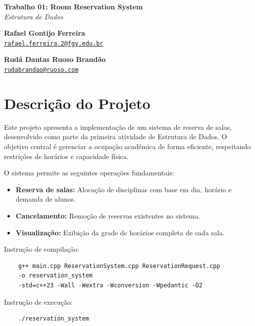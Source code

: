 \documentclass[11pt,a4paper]{article}
\begin{document}
\onehalfspacing
\begin{center}
    \vspace*{0.5cm}
    {\LARGE \textbf{Trabalho 01: Room Reservation System}} \\
    \textit{Estrutura de Dados} \\
    \vspace{0.8cm}

    \begin{minipage}{0.45\textwidth}
        \centering
        \textbf{Rafael Gontijo Ferreira} \\
        \href{mailto:rafael.ferreira.2@fgv.edu.br}{\footnotesize \texttt{rafael.ferreira.2@fgv.edu.br}}
    \end{minipage}
    \begin{minipage}{0.45\textwidth}
        \centering
        \textbf{Rudá Dantas Ruoso Brandão} \\
        \href{mailto:rudabrandao@ruoso.com}{\footnotesize \texttt{rudabrandao@ruoso.com}}
    \end{minipage}
    
    \vspace{0.8cm}
\end{center}

\section*{Descrição do Projeto}
Este projeto apresenta a implementação de um sistema de reserva de salas, desenvolvido como parte da primeira atividade de Estrutura de Dados. O objetivo central é gerenciar a ocupação acadêmica de forma eficiente, respeitando restrições de horários e capacidade física.

O sistema permite as seguintes operações fundamentais:
\begin{itemize}
    \item \textbf{Reserva de salas:} Alocação de disciplinas com base em dia, horário e demanda de alunos.
    \item \textbf{Cancelamento:} Remoção de reservas existentes no sistema.
    \item \textbf{Visualização:} Exibição da grade de horários completa de cada sala.
\end{itemize}
Instrução de compilação:
\begin{verbatim}
    g++ main.cpp ReservationSystem.cpp ReservationRequest.cpp 
    -o reservation_system
    -std=c++23 -Wall -Wextra -Wconversion -Wpedantic -O2
\end{verbatim}
Instrução de execução:
\begin{verbatim}
    ./reservation_system
\end{verbatim}
\end{document}

